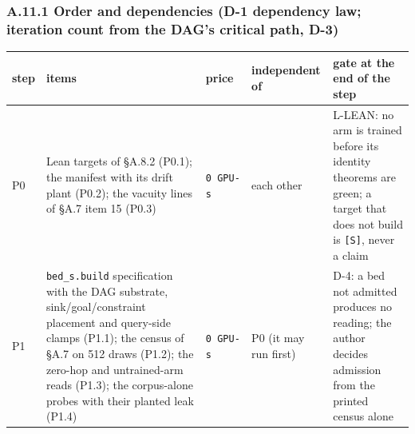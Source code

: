 \documentclass[11pt,a4paper]{article}
\newcounter{none}                 %
\theoremstyle{plain}
\theoremstyle{definition}
\theoremstyle{remark}
\begin{document}
\subsubsection{A.11.1 Order and dependencies (D-1 dependency law;
iteration count from the DAG's critical path,
D-3)}\label{a.11.1-order-and-dependencies-d-1-dependency-law-iteration-count-from-the-dags-critical-path-d-3}

{\def\LTcaptype{none} %
\begin{longtable}[]{@{}
  >{\raggedright\arraybackslash}p{}
  >{\raggedright\arraybackslash}p{}
  >{\raggedright\arraybackslash}p{}
  >{\raggedright\arraybackslash}p{}
  >{\raggedright\arraybackslash}p{}@{}}
\toprule\noalign{}
\begin{minipage}[b]{\linewidth}\raggedright
step
\end{minipage} & \begin{minipage}[b]{\linewidth}\raggedright
items
\end{minipage} & \begin{minipage}[b]{\linewidth}\raggedright
price
\end{minipage} & \begin{minipage}[b]{\linewidth}\raggedright
independent of
\end{minipage} & \begin{minipage}[b]{\linewidth}\raggedright
gate at the end of the step
\end{minipage} \\
\midrule\noalign{}
\endhead
\bottomrule\noalign{}
\endlastfoot
P0 & Lean targets of §A.8.2 (P0.1); the manifest with its drift plant
(P0.2); the vacuity lines of §A.7 item 15 (P0.3) & \texttt{0\ GPU-s} &
each other & L-LEAN: no arm is trained before its identity theorems are
green; a target that does not build is \texttt{{[}S{]}}, never a
claim \\
P1 & \texttt{bed\_s.build} specification with the DAG substrate,
sink/goal/constraint placement and query-side clamps (P1.1); the census
of §A.7 on 512 draws (P1.2); the zero-hop and untrained-arm reads
(P1.3); the corpus-alone probes with their planted leak (P1.4) &
\texttt{0\ GPU-s} & P0 (it may run first) & D-4: a bed not admitted
produces no reading; the author decides admission from the printed
census alone \\

\end{longtable}}
\end{document}
